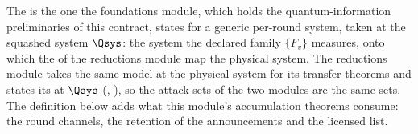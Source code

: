 
The  is the one the foundations module, which holds the
quantum-information preliminaries of this contract, states for a generic
per-round system, taken at the squashed system $\Qsys$: the system the
declared family $\{F_v\}$ measures, onto which the
 of the reductions module map
the physical system. The reductions module takes the same model at the
physical system for its transfer theorems and states its
 at $\Qsys$
(, ), so the
attack sets of the two modules are the same sets. The definition below adds
what this module's accumulation theorems consume: the round channels, the
retention of the announcements and the licensed list.

